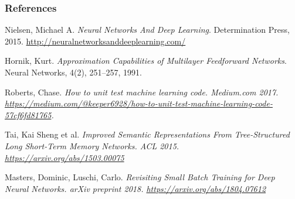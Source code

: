 \documentclass{beamer}
\begin{document}
%   
   \begin{frame}[allowframebreaks]
   	\frametitle{References}
   	\begin{thebibliography}{Hornik, 1991}

   Nielsen, Michael A. {\em Neural Networks And Deep Learning}. Determination Press, 2015. \url{http://neuralnetworksanddeeplearning.com/}
  
   Hornik, Kurt. {\em Approximation Capabilities of Multilayer Feedforward Networks}. Neural Networks, 4(2), 251--257, 1991.
  
   Roberts, Chase. \em{How to unit test machine learning code.} Medium.com 2017. \url{https://medium.com/@keeper6928/how-to-unit-test-machine-learning-code-57cf6fd81765}.
  
   Tai, Kai Sheng et al. \em{Improved Semantic Representations From Tree-Structured Long Short-Term Memory Networks.} ACL 2015. \url{https://arxiv.org/abs/1503.00075}
   
   Masters, Dominic, Luschi, Carlo. \em{Revisiting Small Batch Training for Deep Neural Networks.} arXiv preprint 2018. \url{https://arxiv.org/abs/1804.07612}
   
	\end{thebibliography}   
   \end{frame}  
\end{document}
